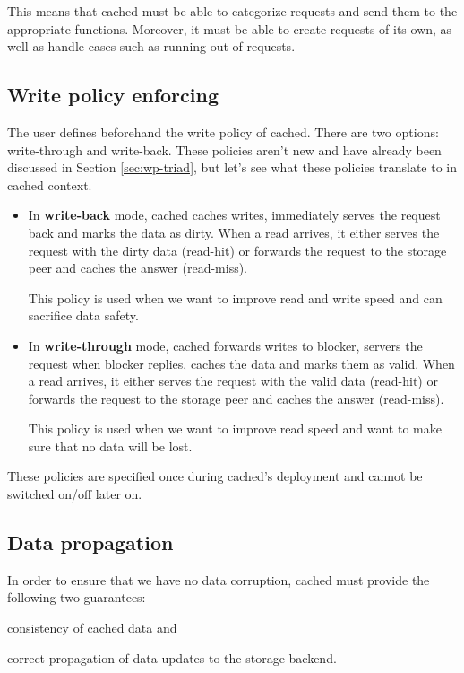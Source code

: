 This means that cached must be able to categorize requests and send them to the 
appropriate functions. Moreover, it must be able to create requests of its own, 
as well as handle cases such as running out of requests.

\subsection{Write policy enforcing}\label{sec:cached-wcp-design}

The user defines beforehand the write policy of cached. There are two options: 
write-through and write-back. These policies aren't new and have already been 
discussed in Section \ref{sec:wp-triad}, but let's see what these policies 
translate to in cached context.

\begin{itemize}
	\item
		In \textbf{write-back} mode, cached caches writes, immediately 
		serves the request back and marks the data as dirty. When a read 
		arrives, it either serves the request with the dirty data 
		(read-hit) or forwards the request to the storage peer and 
		caches the answer (read-miss).

		This policy is used when we want to improve read and write speed 
		and can sacrifice data safety.
	\item
		In \textbf{write-through} mode, cached forwards writes to 
		blocker, servers the request when blocker replies, caches the 
		data and marks them as valid.  When a read arrives, it either 
		serves the request with the valid data (read-hit) or forwards 
		the request to the storage peer and caches the answer 
		(read-miss).

		This policy is used when we want to improve read speed and want 
		to make sure that no data will be lost.
\end{itemize}	

These policies are specified once during cached's deployment and cannot be 
switched on/off later on.

\subsection{Data propagation}

In order to ensure that we have no data corruption, cached must provide the 
following two guarantees:
\begin{inparaenum}[(i)]
\item consistency of cached data and
\item correct propagation of data updates to the storage backend.
\end{inparaenum}

